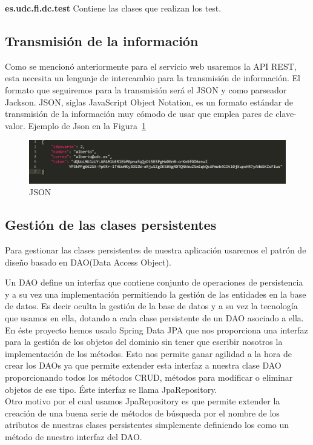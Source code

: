 \textbf{es.udc.fi.dc.test} Contiene las clases que realizan los test.
\subsection{Transmisión de la información}
Como se mencionó anteriormente para el servicio web usaremos la API REST, esta necesita un lenguaje de intercambio para la transmisión de información. El formato que seguiremos para la transmisión será el JSON y como parseador Jackson.
JSON, siglas JavaScript Object Notation, es un formato estándar de transmisión de la información muy cómodo de usar que emplea pares de clave-valor. 	Ejemplo de Json en la Figura~\ref{fig:json}
	\begin{figure}
		\centering
		\includegraphics[width=\textwidth] {json.PNG}
		\caption{JSON }
		\label{fig:json}
	\end{figure}
\subsection{Gestión de las clases persistentes}
Para gestionar las clases persistentes de nuestra aplicación usaremos el patrón de diseño basado en DAO(Data Access Object).

 Un DAO define un interfaz que contiene conjunto de operaciones de persistencia y a su vez una implementación permitiendo la gestión de las entidades en la base de datos. Es decir oculta la gestión de la base de datos y a su vez la tecnología que usamos en ella, dotando a cada clase persistente de un DAO asociado a ella. En éste proyecto hemos usado Spring Data JPA que nos proporciona una interfaz para la gestión de los objetos del dominio sin tener que escribir nosotros la implementación de los métodos. Esto nos permite ganar agilidad a la hora de crear los DAOs ya que permite extender esta interfaz a nuestra clase DAO proporcionando todos los métodos CRUD, métodos para modificar o eliminar objetos de ese tipo. Éste interfaz se llama JpaRepository.\\


Otro motivo por el cual usamos JpaRepository es que permite extender la creación de una buena serie de métodos de búsqueda por el nombre de los atributos de nuestras clases persistentes simplemente definiendo los como un método de nuestro interfaz del DAO.
	
